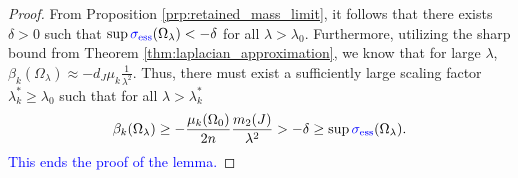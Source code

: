 \documentclass[12pt, a4paper]{article}
\newcommand{\revision}[1]{\textcolor{blue}{#1}}
\theoremstyle{break}
\theoremstyle{break}
\theoremstyle{break}
\theoremstyle{break}
\theoremstyle{break}
\theoremstyle{break}
\theoremstyle{break}
\theoremstyle{break}
\theoremstyle{break}
\begin{document}
\begin{proof}
    From Proposition \ref{prp:retained_mass_limit}, it follows that there exists $\delta > 0$ such that $\sup \revision{\sigma_{\mathrm{ess}}}(\Omega_\lambda) < - \delta$ for all $\lambda > \lambda_0$. Furthermore, utilizing the sharp bound from Theorem \ref{thm:laplacian_approximation}, we know that for large $\lambda$, $\beta_k(\Omega_\lambda) \approx -d_J \mu_k \frac{1}{\lambda^2}$. Thus, there must exist a sufficiently large scaling factor $\lambda_k^* \geq \lambda_0$ such that for all $\lambda > \lambda_k^*$
    \begin{equation}
        \beta_k(\Omega_\lambda) \geq - \frac{\mu_k(\Omega_0)}{2n} \frac{m_2(J)}{\lambda^2} > -\delta \geq \sup \revision{\sigma_{\mathrm{ess}}}(\Omega_\lambda).
    \end{equation}
    \revision{This ends the proof of the lemma.}
\end{proof}
\end{document}
